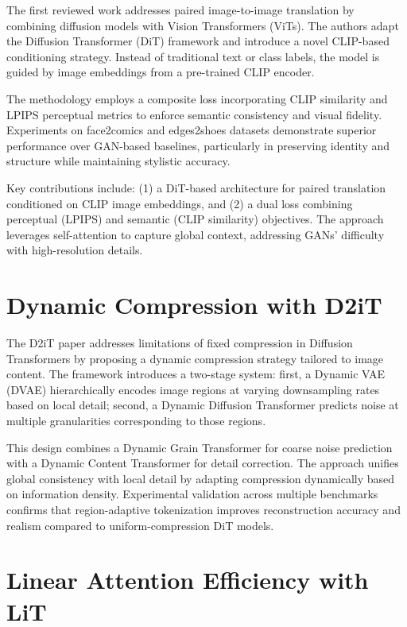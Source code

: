 \documentclass[a4paper]{article}
\begin{document}
The first reviewed work addresses paired image-to-image translation by combining diffusion models with Vision Transformers (ViTs). The authors adapt the Diffusion Transformer (DiT) framework and introduce a novel CLIP-based conditioning strategy. Instead of traditional text or class labels, the model is guided by image embeddings from a pre-trained CLIP encoder.

The methodology employs a composite loss incorporating CLIP similarity and LPIPS perceptual metrics to enforce semantic consistency and visual fidelity. Experiments on face2comics and edges2shoes datasets demonstrate superior performance over GAN-based baselines, particularly in preserving identity and structure while maintaining stylistic accuracy.

Key contributions include: (1) a DiT-based architecture for paired translation conditioned on CLIP image embeddings, and (2) a dual loss combining perceptual (LPIPS) and semantic (CLIP similarity) objectives. The approach leverages self-attention to capture global context, addressing GANs' difficulty with high-resolution details.

\section{Dynamic Compression with D2iT}

The D2iT paper addresses limitations of fixed compression in Diffusion Transformers by proposing a dynamic compression strategy tailored to image content. The framework introduces a two-stage system: first, a Dynamic VAE (DVAE) hierarchically encodes image regions at varying downsampling rates based on local detail; second, a Dynamic Diffusion Transformer predicts noise at multiple granularities corresponding to those regions.

This design combines a Dynamic Grain Transformer for coarse noise prediction with a Dynamic Content Transformer for detail correction. The approach unifies global consistency with local detail by adapting compression dynamically based on information density. Experimental validation across multiple benchmarks confirms that region-adaptive tokenization improves reconstruction accuracy and realism compared to uniform-compression DiT models.

\section{Linear Attention Efficiency with LiT}
\end{document}
